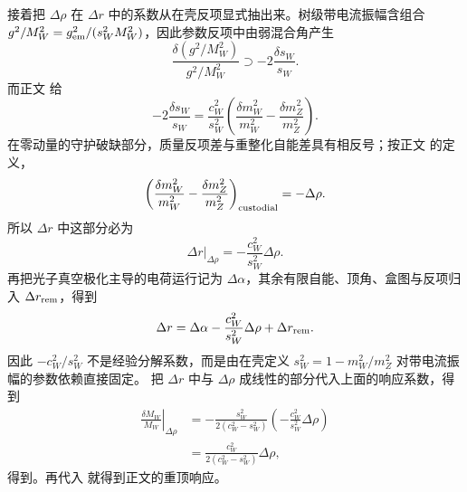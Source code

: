 \begin{derivation}[电弱修正怎样改变矢量质量预测]
接着把 $\Delta\rho$ 在 $\Delta r$ 中的系数从在壳反项显式抽出来。树级带电流振幅含组合 $g^2/M_W^2=g_{\rm em}^2/(s_W^2M_W^2)$，因此参数反项中由弱混合角产生
\begin{equation*}
\frac{\delta(g^2/M_W^2)}{g^2/M_W^2}
\supset -2\frac{\delta s_W}{s_W}.
\end{equation*}
而正文 给
\begin{equation*}
-2\frac{\delta s_W}{s_W}
=\frac{c_W^2}{s_W^2}
\left(\frac{\delta m_W^2}{m_W^2}-\frac{\delta m_Z^2}{m_Z^2}\right).
\end{equation*}
在零动量的守护破缺部分，质量反项差与重整化自能差具有相反号；按正文 的定义，
\begin{equation*}
\left(\frac{\delta m_W^2}{m_W^2}-\frac{\delta m_Z^2}{m_Z^2}\right)_{\rm custodial}
=-\Delta\rho.
\end{equation*}
所以 $\Delta r$ 中这部分必为
\begin{equation*}
\left.\Delta r\right|_{\Delta\rho}
=-\frac{c_W^2}{s_W^2}\Delta\rho.
\end{equation*}
再把光子真空极化主导的电荷运行记为 $\Delta\alpha$，其余有限自能、顶角、盒图与反项归入 $\Delta r_{\rm rem}$，得到
\begin{equation*}
\Delta r
=\Delta\alpha-\frac{c_W^2}{s_W^2}\Delta\rho+\Delta r_{\rm rem}.
\end{equation*}
因此 $-c_W^2/s_W^2$ 不是经验分解系数，而是由在壳定义 $s_W^2=1-m_W^2/m_Z^2$ 对带电流振幅的参数依赖直接固定。
把 $\Delta r$ 中与 $\Delta\rho$ 成线性的部分代入上面的响应系数，得到
\begin{align*}
\left.\frac{\delta M_W}{M_W}\right|_{\Delta\rho}
&=-\frac{s_W^2}{2(c_W^2-s_W^2)}
\left(-\frac{c_W^2}{s_W^2}\Delta\rho\right)\\
&=\frac{c_W^2}{2(c_W^2-s_W^2)}\Delta\rho,
\end{align*}
得到。再代入 就得到正文的重顶响应。
\end{derivation}

